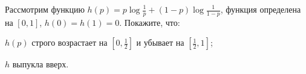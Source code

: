 Рассмотрим функцию $h(p) = p \log \frac{1}{p} + (1 - p) \log \frac{1}{1 - p}$, функция определена на $[0, 1]$, $h(0) = h(1) =
0$. Покажите, что:
\begin{enumcyr}
    \item $h(p)$ строго возрастает на $[0, \frac{1}{2}]$ и убывает на $[\frac{1}{2}, 1]$;
    \item $h$ выпукла вверх. 
\end{enumcyr}